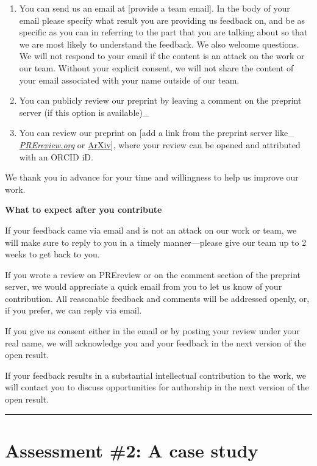 \documentclass[
  letterpaper,
  DIV=11,
  numbers=noendperiod]{scrreport}
\providecommand{\tightlist}{%
  \setlength{\itemsep}{0pt}\setlength{\parskip}{0pt}}\usepackage{longtable,booktabs,array}
\begin{document}
\begin{enumerate}
\def\labelenumi{\arabic{enumi}.}
\tightlist
\item
  You can send us an email at {[}provide a team email{]}. In the body of
  your email please specify what result you are providing us feedback
  on, and be as specific as you can in referring to the part that you
  are talking about so that we are most likely to understand the
  feedback. We also welcome questions. We will not respond to your email
  if the content is an attack on the work or our team. Without your
  explicit consent, we will not share the content of your email
  associated with your name outside of our team.
\item
  You can publicly review our preprint by leaving a comment on the
  preprint server (if this option is available)\_
\item
  You can review our preprint on {[}add a link from the preprint server
  like\_ \href{https://prereview.org/}{\emph{PREreview.org}} or
  \href{https://arxiv.org/}{ArXiv}{]}, where your review can be opened
  and attributed with an ORCID iD.
\end{enumerate}

We thank you in advance for your time and willingness to help us improve
our work.

\textbf{What to expect after you contribute}

If your feedback came via email and is not an attack on our work or
team, we will make sure to reply to you in a timely manner---please give
our team up to 2 weeks to get back to you.

If you wrote a review on PREreview or on the comment section of the
preprint server, we would appreciate a quick email from you to let us
know of your contribution. All reasonable feedback and comments will be
addressed openly, or, if you prefer, we can reply via email.

If you give us consent either in the email or by posting your review
under your real name, we will acknowledge you and your feedback in the
next version of the open result.

If your feedback results in a substantial intellectual contribution to
the work, we will contact you to discuss opportunities for authorship in
the next version of the open result.

\begin{center}\rule{0.5\linewidth}{0.5pt}\end{center}

\hypertarget{assessment-2-a-case-study}{%
\section{Assessment \#2: A case study}\label{assessment-2-a-case-study}}
\end{document}

